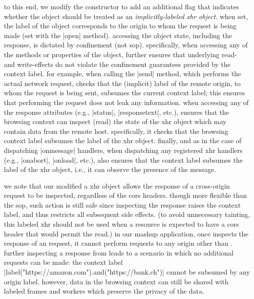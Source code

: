 to this end, we modify the \xhr{} constructor to add an additional
flag that indicates whether the object should be treated as an
\emph{implicitly-labeled xhr object}.
%
when set, the  label of the object corresponds to the origin
to whom the request is being made (set with the \js|open| method). 
accessing the object state, including the response, is dictated by
confinement (not sop).
%
specifically, when accessing any of the methods or properties of
the object, \sys{} further ensures that underlying read- and
write-effects do not violate the confinement guarantees provided by
the context label.
%
for example, when calling the \js|send| method, which performs the
actual network request, \sys{} checks that the (implicit) label of the
remote origin, to whom the request is being sent, subsumes the current
context label;
%
this ensures that performing the request does not leak any
information.
%
when accessing any of the response attributes (e.g., \js|status|,
\js|responsetext|, etc.), \sys{} ensures that the browsing context can inspect
(read) the state of the xhr object which may contain data from the remote host.
%
specifically, it checks that the browsing context label subsumes the
label of the xhr object.
%
finally, and as in the case of dispatching \js|onmessage| handlers,
when dispatching any registered xhr
handlers (e.g., \js|onabort|, \js|onload|, etc.), \sys{} also ensures
that the context label subsumes the label of the xhr object, i.e., it
can observe the presence of the message.
 
we note that our modified a xhr object allows the response of a
cross-origin request to be inspected, regardless of the cors headers.
%
though more flexible than the sop, such action is still safe since inspecting
the response raises the context label, and thus restricts all subsequent side
effects.
%
(to avoid unnecessary tainting, this labeled xhr should not be used
when a resource is expected to have a cors header that would permit
the read.)
%
in our mashup application, once  inspects the
response of an  request, it cannot perform requests
to any origin other than .
%
further inspecting a response from  leads to a scenario
in which no additional requests can be made: the context label  
\js|label("https://amazon.com").and("https://bank.ch")|
cannot be subsumed by any origin label. 
%
however, data in the browsing context can still be shared with labeled
frames and workers which preserve the privacy of the data.
% 

